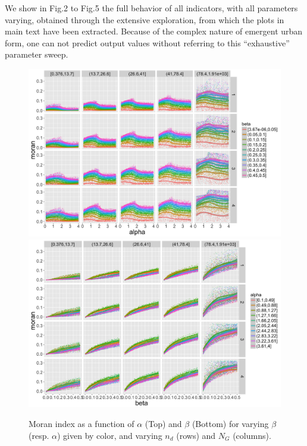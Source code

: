 We show in Fig.2 to Fig.5 the full behavior of all indicators, with all parameters varying, obtained through the extensive exploration, from which the plots in main text have been extracted. Because of the complex nature of emergent urban form, one can not predict output values without referring to this ``exhaustive'' parameter sweep.


\begin{figure}
\centering
\includegraphics[width=\textwidth]{figuresraw/moran_alpha}
\includegraphics[width=\textwidth]{figuresraw/moran_beta}
\caption{Moran index as a function of $\alpha$ (Top) and $\beta$ (Bottom) for varying $\beta$ (resp. $\alpha$) given by color, and varying $n_d$ (rows) and $N_G$ (columns).}
\label{fig:moran}
\end{figure}

